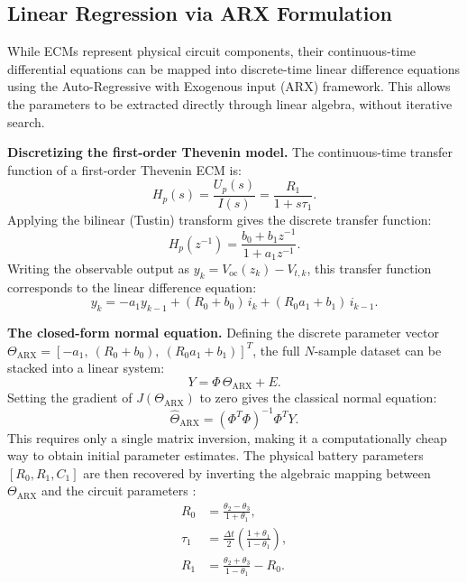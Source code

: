 \subsection{Linear Regression via ARX Formulation}
\label{subsec:arx_formulation}

While ECMs represent physical circuit components, their continuous-time differential equations can be mapped into discrete-time linear difference equations using the Auto-Regressive with Exogenous input (ARX) framework. This allows the parameters to be extracted directly through linear algebra, without iterative search.

\textbf{Discretizing the first-order Thevenin model.} The continuous-time transfer function of a first-order Thevenin ECM is:
\begin{equation}
\label{eq:thevenin_tf_cont}
H_p(s) = \frac{U_p(s)}{I(s)} = \frac{R_1}{1 + s\tau_1}.
\end{equation}
Applying the bilinear (Tustin) transform gives the discrete transfer function:
\begin{equation}
\label{eq:thevenin_tf_disc}
H_p(z^{-1}) = \frac{b_0 + b_1 z^{-1}}{1 + a_1 z^{-1}}.
\end{equation}
Writing the observable output as $y_k = V_{\mathrm{oc}}(z_k) - V_{t,k}$, this transfer function corresponds to the linear difference equation:
\begin{equation}
\label{eq:arx_difference}
y_k = -a_1 y_{k-1} + (R_0 + b_0)\, i_k + (R_0 a_1 + b_1)\, i_{k-1}.
\end{equation}

\textbf{The closed-form normal equation.} Defining the discrete parameter vector $\Theta_{\mathrm{ARX}} = [-a_1,\ (R_0+b_0),\ (R_0 a_1 + b_1)]^T$, the full $N$-sample dataset can be stacked into a linear system:
\begin{equation}
\label{eq:arx_matrix}
Y = \Phi\, \Theta_{\mathrm{ARX}} + E.
\end{equation}
Setting the gradient of $J(\Theta_{\mathrm{ARX}})$ to zero gives the classical normal equation:
\begin{equation}
\label{eq:normal_equation}
\hat{\Theta}_{\mathrm{ARX}} = (\Phi^T \Phi)^{-1} \Phi^T Y.
\end{equation}
This requires only a single matrix inversion, making it a computationally cheap way to obtain initial parameter estimates. The physical battery parameters $[R_0, R_1, C_1]$ are then recovered by inverting the algebraic mapping between $\Theta_{\mathrm{ARX}}$ and the circuit parameters \cite{plett2015battery_v1}:
\begin{align}
R_0 &= \frac{\theta_2 - \theta_3}{1 + \theta_1}, \label{eq:arx_to_r0} \\[4pt]
\tau_1 &= \frac{\Delta t}{2}\left(\frac{1 + \theta_1}{1 - \theta_1}\right), \label{eq:arx_to_tau1} \\[4pt]
R_1 &= \frac{\theta_2 + \theta_3}{1 - \theta_1} - R_0. \label{eq:arx_to_r1}
\end{align}

